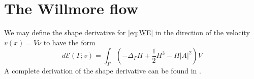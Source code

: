 

\newpage
\section{The Willmore flow}%
\label{sec:evolutionary_pde_s_of_the_willmore_flow}

We may define the shape derivative for \eqref{eq:WE} in the direction of the velocity $v\left( x \right)  = V \nu  $  to have the form \[
d\mathcal{E} \left( \Gamma; v  \right)  = \int_{\Gamma }^{} \left( - \Delta _{\Gamma } H + \frac{1}{2} H^{3} - H \left\lvert A \right\rvert^2  \right) V
\]
A complete derivation of the shape derivative can be found in \cite[Corally 4.7]{dougan2012first}.










